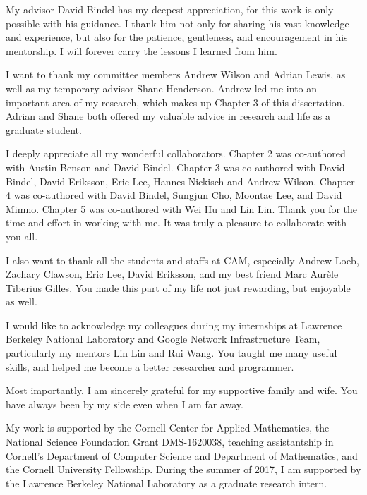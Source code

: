 My advisor David Bindel has my deepest appreciation, for this work is only
possible with his guidance. I thank him not only for sharing his vast knowledge
and experience, but also for the patience, gentleness, and encouragement in his
mentorship. I will forever carry the lessons I learned from him.

I want to thank my committee members Andrew Wilson and Adrian Lewis, as well as
my temporary advisor Shane Henderson. Andrew led me into an important area of my
research, which makes up Chapter 3 of this dissertation. Adrian and Shane both
offered my valuable advice in research and life as a graduate student.

I deeply appreciate all my wonderful collaborators. Chapter 2 was co-authored
with Austin Benson and David Bindel. Chapter 3 was co-authored with David
Bindel, David Eriksson, Eric Lee, Hannes Nickisch and Andrew Wilson. Chapter 4
was co-authored with David Bindel, Sungjun Cho, Moontae Lee, and David Mimno.
Chapter 5 was co-authored with Wei Hu and Lin Lin. Thank you for the time and
effort in working with me. It was truly a pleasure to collaborate with you all.

I also want to thank all the students and staffs at CAM, especially  Andrew
Loeb, Zachary Clawson, Eric Lee, David Eriksson, and my best friend Marc Aur\`
{e}le Tiberius Gilles. You made this part of my life not just rewarding, but
enjoyable as well.

I would like to acknowledge my colleagues during my internships at Lawrence
Berkeley National Laboratory and Google Network Infrastructure Team,
particularly my mentors Lin Lin and Rui Wang. You taught me many useful skills,
and helped me become a better researcher and programmer.

Most importantly, I am sincerely grateful for my supportive family and wife. You
have always been by my side even when I am far away.

My work is supported by the Cornell Center for Applied Mathematics, the National
Science Foundation Grant DMS-1620038, teaching assistantship in Cornell's
Department of Computer Science and Department of Mathematics, and the Cornell
University Fellowship. During the summer of 2017, I am supported by the Lawrence
Berkeley National Laboratory as a graduate research intern.
